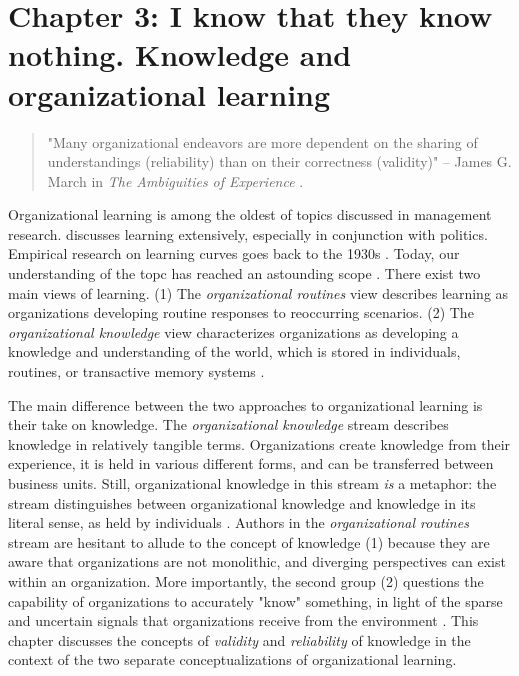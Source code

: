 \section{Chapter 3: I know that they know nothing. Knowledge and organizational learning}

\begin{singlespace}
	\begin{quote}
		"Many organizational endeavors are more dependent on the sharing of understandings (reliability) than on their correctness (validity)" -- James G. March in \textit{The Ambiguities of Experience} \citep[p. 69]{March2010}.
	\end{quote}
\end{singlespace}

Organizational learning is among the oldest of topics discussed in management research. \citet{March1963} discusses learning extensively, especially in conjunction with politics. Empirical research on learning curves goes back to the 1930s \citep{Wright1936}. Today, our understanding of the topc has reached an astounding scope \citep{Argote2013}. There exist two main views of learning. (1) The \textit{organizational routines} view describes learning as organizations developing routine responses to reoccurring scenarios. (2) The \textit{organizational knowledge} view characterizes organizations as developing a knowledge and understanding of the world, which is stored in individuals, routines, or transactive memory systems \citep{Argote2011}.

The main difference between the two approaches to organizational learning is their take on knowledge. The \textit{organizational knowledge} stream describes knowledge in relatively tangible terms. Organizations create knowledge from their experience, it is held in various different forms, and can be transferred between business units. Still, organizational knowledge in this stream \textit{is} a metaphor: the stream distinguishes between organizational knowledge and knowledge in its literal sense, as held by individuals \citep{Argote2011}. Authors in the \textit{organizational routines} stream are hesitant to allude to the concept of knowledge (1) because they are aware that organizations are not monolithic, and diverging perspectives can exist within an organization. More importantly, the second group (2) questions the capability of organizations to accurately "know" something, in light of the sparse and uncertain signals that organizations receive from the environment \citep{March1975}. This chapter discusses the concepts of \textit{validity} and \textit{reliability} of knowledge in the context of the two separate conceptualizations of organizational learning.

